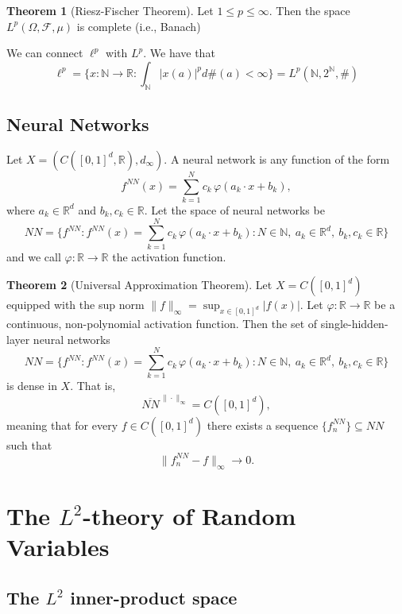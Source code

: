 \documentclass[11pt,a4paper]{article}
\theoremstyle{definition}
\newtheorem{theorem}{Theorem}[section]
\begin{document}
\begin{theorem}[Riesz-Fischer Theorem]
Let $1 \le p \le \infty$. Then the space $L^p (\Omega, \mathcal{F}, \mu)$ is complete (i.e., Banach)
\end{theorem}
\noindent
We can connect $\ell ^p$ with $L^p$. We have that 
\[
\ell ^p = \{x:\mathbb{N} \to \mathbb{R} : \int _\mathbb{N} |x(a)|^p d \#(a) < \infty\} = L^p (\mathbb{N}, 2^{\mathbb{N}}, \#)
\]


\subsection{Neural Networks}
Let $X= (C([0,1]^d, \mathbb{R}), d_{\infty})$. A neural network is any function of the form
\[
f^{NN}(x) = \sum_{k=1}^N c_k \,\varphi(a_k \cdot x + b_k),
\]
where $a_k \in \mathbb{R}^d$ and $b_k, c_k \in \mathbb{R}$. Let the space of neural networks be
\[
NN = \bigg\{ f^{NN}:
f^{NN}(x) = \sum_{k=1}^N c_k\,\varphi(a_k \cdot x + b_k) :
N \in \mathbb{N},\ a_k\in\mathbb{R}^d,\ b_k,c_k\in\mathbb{R}
\bigg\}
\]
and we call $\varphi:\mathbb{R} \to \mathbb{R}$ the activation function.

\begin{theorem}[Universal Approximation Theorem]
Let $X = C([0,1]^d)$ equipped with the sup norm 
$\|f\|_\infty = \sup_{x \in [0,1]^d} |f(x)|$.
Let $\varphi : \mathbb{R} \to \mathbb{R}$ be a continuous, non-polynomial 
activation function.  Then the set of single-hidden-layer neural networks
\[
NN = \bigg\{ f^{NN} :
f^{NN}(x) = \sum_{k=1}^N c_k\,\varphi(a_k \cdot x + b_k) :
N \in \mathbb{N},\ a_k\in\mathbb{R}^d,\ b_k,c_k\in\mathbb{R}
\bigg\}
\]
is dense in $X$.  That is,
\[
\overline{NN}^{\,\|\cdot\|_\infty} = C([0,1]^d),
\]
meaning that for every $f\in C([0,1]^d)$ there exists a sequence 
$\{f_n^{NN}\}\subseteq NN$ such that
\[
\|f_n^{NN} - f\|_\infty \to 0.
\]
\end{theorem}

\newpage

\section{The $L^2$-theory of Random Variables}

\subsection{The $L^2$ inner-product space}
\end{document}

